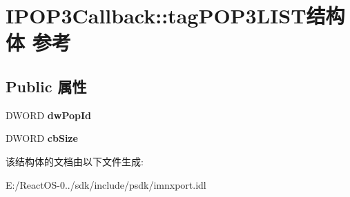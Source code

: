 \hypertarget{struct_i_p_o_p3_callback_1_1tag_p_o_p3_l_i_s_t}{}\section{I\+P\+O\+P3\+Callback\+:\+:tag\+P\+O\+P3\+L\+I\+S\+T结构体 参考}
\label{struct_i_p_o_p3_callback_1_1tag_p_o_p3_l_i_s_t}
\subsection*{Public 属性}
\begin{DoxyCompactItemize}
\item 
\mbox{\label{struct_i_p_o_p3_callback_1_1tag_p_o_p3_l_i_s_t_acf00af0d2d15c95266d67d838ee5cb07}} 
D\+W\+O\+RD {\bfseries dw\+Pop\+Id}
\item 
\mbox{\label{struct_i_p_o_p3_callback_1_1tag_p_o_p3_l_i_s_t_aec16139103ebfbbd0b727bc32de83c54}} 
D\+W\+O\+RD {\bfseries cb\+Size}
\end{DoxyCompactItemize}


该结构体的文档由以下文件生成\+:\begin{DoxyCompactItemize}
\item 
E\+:/\+React\+O\+S-\/0../sdk/include/psdk/imnxport.\+idl\end{DoxyCompactItemize}
